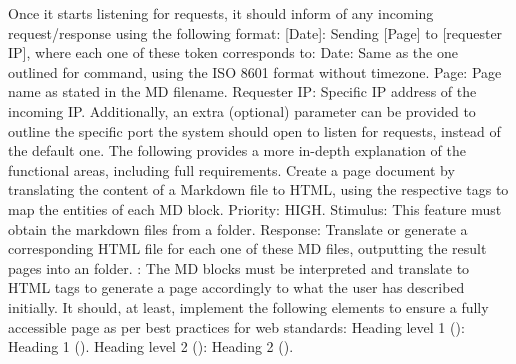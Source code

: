 {}Once it starts listening for requests, it should inform of any incoming request/response using the following format: [Date]: Sending [Page] to [requester IP], where each one of these token corresponds to:\markdownRendererInterblockSeparator
{}\markdownRendererUlBeginTight
\markdownRendererUlItem Date: Same as the one outlined for  command, using the ISO 8601 format without timezone.\markdownRendererUlItemEnd 
\markdownRendererUlItem Page: Page name as stated in the MD filename.\markdownRendererUlItemEnd 
\markdownRendererUlItem Requester IP: Specific IP address of the incoming IP.\markdownRendererUlItemEnd 
\markdownRendererUlEndTight \markdownRendererInterblockSeparator
{}Additionally, an extra (optional) parameter can be provided to outline the specific port the system should open to listen for requests, instead of the default one.\markdownRendererInterblockSeparator
{}\markdownRendererInterblockSeparator
{}The following provides a more in-depth explanation of the functional areas, including full requirements.\markdownRendererInterblockSeparator
{}\markdownRendererInterblockSeparator
{}\markdownRendererInterblockSeparator
{}Create a page document by translating the content of a Markdown file to HTML, using the respective tags to map the entities of each MD block. Priority: HIGH.\markdownRendererInterblockSeparator
{}\markdownRendererInterblockSeparator
{}Stimulus: This feature must obtain the markdown files from a  folder.\markdownRendererInterblockSeparator
{}Response: Translate or generate a corresponding HTML file for each one of these MD files, outputting the result pages into an  folder.\markdownRendererInterblockSeparator
{}\markdownRendererInterblockSeparator
{}: The MD blocks must be interpreted and translate to HTML tags to generate a page accordingly to what the user has described initially. It should, at least, implement the following elements to ensure a fully accessible page as per best practices for web standards:\markdownRendererInterblockSeparator
{}\markdownRendererUlBeginTight
\markdownRendererUlItem Heading level 1 (\markdownRendererCodeSpan{\markdownRendererHash{}}): Heading 1 ().\markdownRendererUlItemEnd 
\markdownRendererUlItem Heading level 2 (\markdownRendererCodeSpan{\markdownRendererHash{}\markdownRendererHash{}}): Heading 2 ().\markdownRendererUlItemEnd 

